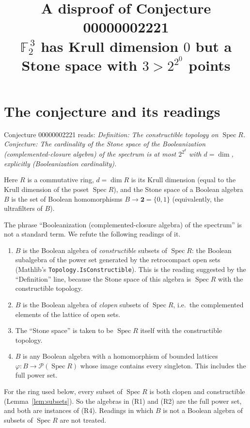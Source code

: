 \documentclass[11pt]{article}
\title{A disproof of Conjecture 00000002221\\[2pt]
\large $\mathbb F_2^{\,3}$ has Krull dimension $0$ but a Stone space with $3>2^{2^0}$ points}
\date{}
\renewcommand{\_}{\oldus\allowbreak}
\theoremstyle{definition}
\theoremstyle{remark}
\begin{document}
\sloppy
\maketitle

\section{The conjecture and its readings}

Conjecture 00000002221 reads: \emph{Definition: The constructible topology on $\operatorname{Spec} R$.
Conjecture: The cardinality of the Stone space of the Booleanization (complemented-closure algebra) of the
spectrum is at most $2^{2^d}$ with $d=\dim$, explicitly (Booleanization cardinality).}

Here $R$ is a commutative ring, $d=\dim R$ is its Krull dimension (equal to the Krull dimension of the
poset $\operatorname{Spec} R$), and the Stone space of a Boolean algebra $B$ is the set of Boolean
homomorphisms $B\to\mathbf 2=\{0,1\}$ (equivalently, the ultrafilters of $B$).

The phrase ``Booleanization (complemented-closure algebra) of the spectrum'' is not a standard term. We
refute the following readings of it.
\begin{enumerate}
\item[(R1)] $B$ is the Boolean algebra of \emph{constructible} subsets of $\operatorname{Spec} R$: the
Boolean subalgebra of the power set generated by the retrocompact open sets (Mathlib's
\texttt{Topology.IsConstructible}). This is the reading suggested by the ``Definition'' line, because the
Stone space of this algebra is $\operatorname{Spec} R$ with the constructible topology.
\item[(R2)] $B$ is the Boolean algebra of \emph{clopen} subsets of $\operatorname{Spec} R$, i.e.\ the
complemented elements of the lattice of open sets.
\item[(R3)] The ``Stone space'' is taken to be $\operatorname{Spec} R$ itself with the constructible
topology.
\item[(R4)] $B$ is any Boolean algebra with a homomorphism of bounded lattices $\varphi:B\to
\mathcal P(\operatorname{Spec} R)$ whose image contains every singleton. This includes the full power set.
\end{enumerate}
For the ring used below, every subset of $\operatorname{Spec} R$ is both clopen and constructible
(Lemma~\ref{lem:subsets}). So the algebras in (R1) and (R2) are the full power set, and both are instances
of (R4). Readings in which $B$ is not a Boolean algebra of subsets of $\operatorname{Spec}R$ are not
treated.
\end{document}

